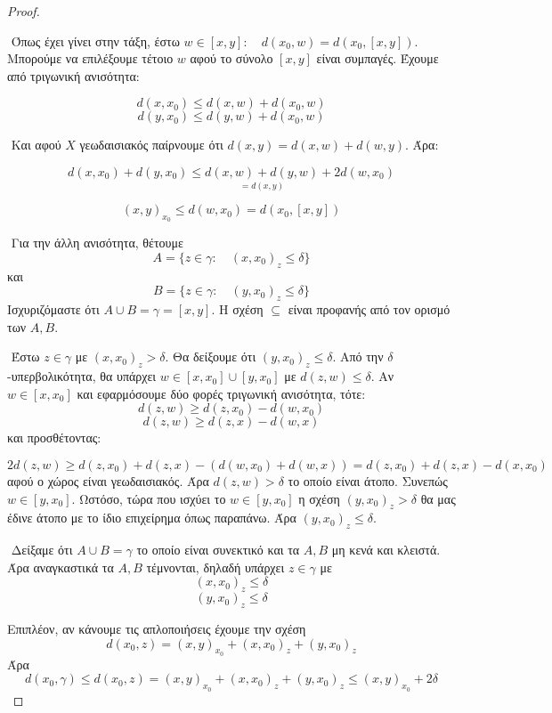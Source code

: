 \documentclass[oneside,a4paper]{article}
\begin{document}
\begin{proof} $ $

	$ $\newline
	Όπως έχει γίνει στην τάξη, έστω $w \in [x,y]: \quad d(x_0,w) = d(x_0, [x,y])$. Μπορούμε να επιλέξουμε τέτοιο $w$ αφού το σύνολο $[x,y]$ είναι συμπαγές. Έχουμε από τριγωνική ανισότητα:

	$$d(x,x_0) \leq d(x,w) + d(x_0,w)$$
	$$d(y,x_0) \leq d(y,w) + d(x_0,w)$$

	$ $\newline
	Και αφού $X$ γεωδαισιακός παίρνουμε ότι $d(x,y) = d(x,w) + d(w,y)$. Άρα:

	$$d(x,x_0) + d(y,x_0) \leq \underset{=d(x,y)}{d(x,w) +  d(y,w)} + 2 d(w,x_0)$$

	$$(x,y)_{x_0} \leq d(w,x_0) = d(x_0,[x,y])$$

	$ $\newline
	Για την άλλη ανισότητα, θέτουμε $$A= \{z \in \gamma: \quad (x,x_0)_z \leq \delta \}$$ και $$B = \{z \in \gamma: \quad (y,x_0)_z \leq \delta\}$$ Ισχυριζόμαστε ότι $A\cup B = \gamma = [x,y]$. Η σχέση $\subseteq$ είναι προφανής από τον ορισμό των $A,B$. 
	
	
	$ $\newline
	Έστω $z \in \gamma$ με $(x,x_0)_z > \delta$. Θα δείξουμε ότι $(y,x_0)_z \leq \delta$. Από την $\delta$-υπερβολικότητα, θα υπάρχει $w \in [x,x_0]\cup[y,x_0]$ με $d(z,w)\leq \delta$. Αν $w\in [x,x_0]$ και εφαρμόσουμε δύο φορές τριγωνική ανισότητα, τότε:
	$$d(z,w)\geq d(z,x_0) - d(w,x_0)$$
	$$d(z,w) \geq d(z,x) - d(w,x)$$ και προσθέτοντας:

	$$2d(z,w) \geq d(z,x_0) + d(z,x) - \left( d(w,x_0) + d(w,x)\right) = d(z,x_0) + d(z,x) - d(x,x_0)$$ αφού ο χώρος είναι γεωδαισιακός. Άρα $d(z,w) > \delta$ το οποίο είναι άτοπο. Συνεπώς $w \in [y,x_0]$. Ωστόσο, τώρα που ισχύει το $w \in [y,x_0]$ η σχέση $(y,x_0)_z > \delta$ θα μας έδινε άτοπο με το ίδιο επιχείρημα όπως παραπάνω. Άρα $(y,x_0)_z \leq \delta$.

	$ $\newline
	Δείξαμε ότι $A\cup B = \gamma$ το οποίο είναι συνεκτικό και τα $A,B$ μη κενά και κλειστά. Άρα αναγκαστικά τα $A,B$ τέμνονται, δηλαδή υπάρχει $z \in \gamma$ με 
	$$(x,x_0)_z \leq \delta$$
	$$(y,x_0)_z \leq \delta$$


	\noindent Επιπλέον, αν κάνουμε τις απλοποιήσεις έχουμε την σχέση $$d(x_0,z) = (x,y)_{x_0} + (x,x_0)_z + (y,x_0)_z$$ Άρα $$d(x_0,\gamma) \leq d(x_0,z) = (x,y)_{x_0} + (x,x_0)_z + (y,x_0)_z \leq (x,y)_{x_0} + 2\delta$$
\end{proof}
\end{document}
